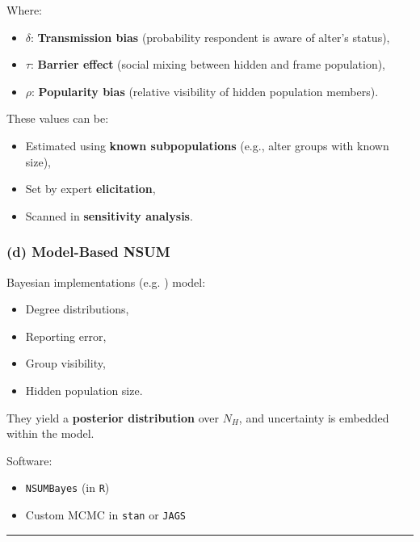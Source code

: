 \documentclass[
  12pt,
  letterpaper,
  DIV=11,
  numbers=noendperiod]{scrartcl}
\theoremstyle{plain}
\theoremstyle{definition}
\begin{document}
Where:

\begin{itemize}
\item
  \(\delta\): \textbf{Transmission bias} (probability respondent is
  aware of alter's status),
\item
  \(\tau\): \textbf{Barrier effect} (social mixing between hidden and
  frame population),
\item
  \(\rho\): \textbf{Popularity bias} (relative visibility of hidden
  population members).
\end{itemize}

These values can be:

\begin{itemize}
\item
  Estimated using \textbf{known subpopulations} (e.g., alter groups with
  known size),
\item
  Set by expert \textbf{elicitation},
\item
  Scanned in \textbf{sensitivity analysis}.
\end{itemize}

\subsubsection{(d) Model-Based NSUM}\label{d-model-based-nsum}

Bayesian implementations (e.g. \textcite{malt15-estimating}) model:

\begin{itemize}
\item
  Degree distributions,
\item
  Reporting error,
\item
  Group visibility,
\item
  Hidden population size.
\end{itemize}

They yield a \textbf{posterior distribution} over \(N_H\), and
uncertainty is embedded within the model.

Software:

\begin{itemize}
\item
  \texttt{NSUMBayes} (in \texttt{R})
\item
  Custom MCMC in \texttt{stan} or \texttt{JAGS}
\end{itemize}

\begin{center}\rule{0.5\linewidth}{0.5pt}\end{center}
\end{document}
